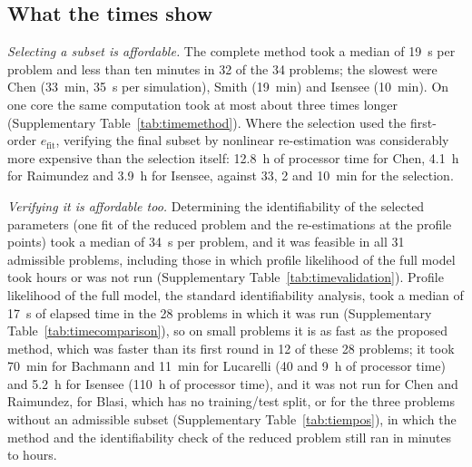 \subsection*{What the times show}
\emph{Selecting a subset is affordable.} The complete method took a median of 19~s per problem and less than ten minutes in 32 of the 34 problems; the slowest were Chen (33~min, 35~s per simulation), Smith (19~min) and Isensee (10~min). On one core the same computation took at most about three times longer (Supplementary Table~\ref{tab:timemethod}). Where the selection used the first-order $e_{\mathrm{fit}}$, verifying the final subset by nonlinear re-estimation was considerably more expensive than the selection itself: 12.8~h of processor time for Chen, 4.1~h for Raimundez and 3.9~h for Isensee, against 33, 2 and 10~min for the selection.

\emph{Verifying it is affordable too.} Determining the identifiability of the selected parameters (one fit of the reduced problem and the re-estimations at the profile points) took a median of 34~s per problem, and it was feasible in all 31 admissible problems, including those in which profile likelihood of the full model took hours or was not run (Supplementary Table~\ref{tab:timevalidation}). Profile likelihood of the full model, the standard identifiability analysis, took a median of 17~s of elapsed time in the 28 problems in which it was run (Supplementary Table~\ref{tab:timecomparison}), so on small problems it is as fast as the proposed method, which was faster than its first round in 12 of these 28 problems; it took 70~min for Bachmann and 11~min for Lucarelli (40 and 9~h of processor time) and 5.2~h for Isensee (110~h of processor time), and it was not run for Chen and Raimundez, for Blasi, which has no training/test split, or for the three problems without an admissible subset (Supplementary Table~\ref{tab:tiempos}), in which the method and the identifiability check of the reduced problem still ran in minutes to hours.

